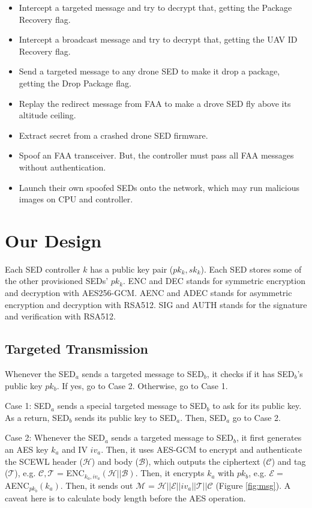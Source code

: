 \documentclass[11pt,oneside,onecolumn,letterpaper]{article}
\begin{document}
\begin{itemize}
	\item Intercept a targeted message and try to decrypt that, getting the Package Recovery flag.

	\item Intercept a broadcast message and try to decrypt that, getting the UAV ID Recovery flag.	
	
	\item Send a targeted message to any drone SED to make it drop a package, getting the Drop Package flag.		
	
	\item Replay the redirect message from FAA to make a drove SED fly above its altitude ceiling.
	
	\item Extract secret from a crashed drone SED firmware.  
	
	\item Spoof an FAA transceiver. But, the controller must pass all FAA messages without authentication.
	
	\item Launch their own spoofed SEDs onto the network, which may run malicious images on CPU and controller.
\end{itemize}

\section{Our Design}
Each SED controller $k$ has a public key pair ($pk_k, sk_k$).
Each SED stores some of the other provisioned SEDs' $pk_k$.
ENC and DEC stands for symmetric encryption and decryption with AES256-GCM.
AENC and ADEC stands for asymmetric encryption and decryption with RSA512.
SIG and AUTH stands for the signature and verification with RSA512.

\subsection{Targeted Transmission}
Whenever the SED$_a$ sends a targeted message to SED$_b$, it checks if it has SED$_b$'s public key $pk_b$. If yes, go to Case 2. Otherwise, go to Case 1.

Case 1: SED$_a$ sends a special targeted message to SED$_b$ to ask for its public key.
As a return, SED$_b$ sends its public key to SED$_a$. Then, SED$_a$ go to Case 2.

Case 2: Whenever the SED$_a$ sends a targeted message to SED$_b$, it first generates an AES key $k_a$ and IV $iv_a$. 
Then, it uses AES-GCM to encrypt and authenticate the SCEWL header ($\mathcal{H}$) and body ($\mathcal{B}$), which outputs the ciphertext ($\mathcal{C}$) and tag ($\mathcal{T}$), e.g. $\mathcal{C}, \mathcal{T}$ = ENC$_{k_a, iv_a}(\mathcal{H} || \mathcal{B})$.
Then, it encrypts $k_a$ with $pk_b$, e.g. $\mathcal{E}=$AENC$_{pk_b}(k_a)$.
Then, it sends out $\mathcal{M}$ = $\mathcal{H} || \mathcal{E}||iv_a||\mathcal{T}||\mathcal{C}$ (Figure \ref{fig:msg}).
A caveat here is to calculate body length before the AES operation.
\end{document}
